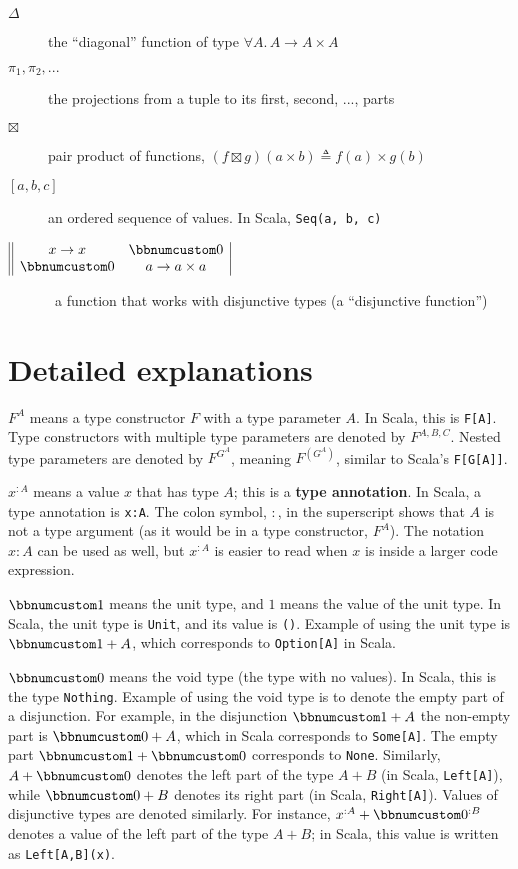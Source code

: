 \begin{description}
\item [{$\Delta$}] the \textsf{``}diagonal\textsf{''} function of type $\forall A.\,A\rightarrow A\times A$
\item [{$\pi_{1},\pi_{2},...$}] the projections from a tuple to its first,
second, ..., parts
\item [{$\boxtimes$}] pair product of functions, $(f\boxtimes g)(a\times b)\triangleq f(a)\times g(b)$
\item [{$\left[a,b,c\right]$}] an ordered sequence of values. In Scala,
\lstinline!Seq(a, b, c)!
\item [{$\begin{array}{||cc|}
x\rightarrow x & \bbnum 0\\
\bbnum 0 & a\rightarrow a\times a
\end{array}$}] ~a function that works with disjunctive types (a \textsf{``}disjunctive
function\textsf{''})
\end{description}

\section{Detailed explanations}

$F^{A}$ means a type constructor $F$ with a type parameter $A$.
In Scala, this is \lstinline!F[A]!. Type constructors with multiple
type parameters are denoted by $F^{A,B,C}$. Nested type parameters
are denoted by $F^{G^{A}}$, meaning $F^{(G^{A})}$, similar to Scala\textsf{'}s
\lstinline!F[G[A]]!.

$x^{:A}$ means a value $x$ that has type $A$; this is a \textbf{type
annotation}. In Scala, a type annotation is \lstinline!x:A!. The
colon symbol, $:$, in the superscript shows that $A$ is not a type
argument (as it would be in a type constructor, $F^{A}$). The notation
$x:A$ can be used as well, but $x^{:A}$ is easier to read when $x$
is inside a larger code expression. 

$\bbnum 1$ means the unit type, and $1$ means
the value of the unit type. In Scala, the unit type is \lstinline!Unit!,
and its value is \lstinline!()!. Example of using the unit type is
$\bbnum 1+A$, which corresponds to \lstinline!Option[A]! in Scala.

$\bbnum 0$ means the void type (the type with no
values). In Scala, this is the type \lstinline!Nothing!. Example
of using the void type is to denote the empty part of a disjunction.
For example, in the disjunction $\bbnum 1+A$ the non-empty part is
$\bbnum 0+A$, which in Scala corresponds to \lstinline!Some[A]!.
The empty part $\bbnum 1+\bbnum 0$ corresponds to \lstinline!None!.
Similarly, $A+\bbnum 0$ denotes the left part of the type $A+B$
(in Scala, \lstinline!Left[A]!), while $\bbnum 0+B$ denotes its
right part (in Scala, \lstinline!Right[A]!). Values of disjunctive
types are denoted similarly. For instance, $x^{:A}+\bbnum 0^{:B}$
denotes a value of the left part of the type $A+B$; in Scala, this
value is written as \lstinline!Left[A,B](x)!.

